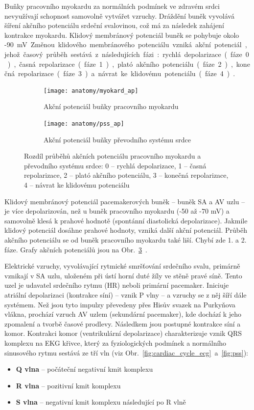 Buňky pracovního myokardu za normálních podmínek ve zdravém srdci nevyužívají
schopnost samovolně vytvářet vzruchy. Dráždění buněk vyvolává šíření akčního
potenciálu srdeční svalovinou, což má za následek zahájení kontrakce myokardu.
Klidový membránový potenciál buněk se pohybuje okolo -90~\si\mV. Změnou klidového
membránového potenciálu vzniká akční potenciál, jehož časový průběh sestává z
následujících fázi: rychlá depolarizace (fáze 0), časná repolarizace (fáze 1),
plató akčního potenciálu (fáze 2), konečná repolarizace (fáze 3) a návrat ke
klidovému potenciálu (fáze 4)~\cite{Petrek2019}.
\begin{figure}[h]
	\centering
	\begin{subfigure}{0.4\textwidth}
		\texttt{[image: anatomy/myokard\_ap]}
		\caption{Akční potenciál buňky pracovního myokardu~\cite{Petrek2019}}
		\label{fig:myokard_ap}
	\end{subfigure}
	\hfil
	\begin{subfigure}{0.5\textwidth}
		\texttt{[image: anatomy/pss\_ap]}
		\caption{Akční potenciál buňky převodního systému
		srdce~\cite{Petrek2019}}
		\label{fig:pss_ap}
	\end{subfigure}
	\caption{Rozdíl průběhů akčních potenciálu pracovního myokardu a převodního
		systému srdce: 0 -- rychlá depolarizace, 1 -- časná repolarizace, 2 --
		plató akčního potenciálu, 3 -- konečná repolarizace, 4 -- návrat ke
		klidovému potenciálu}
	\label{fig:ap}
\end{figure}
Klidový membránový potenciál pacemakerových buněk -- buněk SA a AV uzlu -- je
více depolarizován, než u buněk pracovního myokardu (-50 až -70 mV) a samovolně
klesá k prahové hodnotě (spontánní diastolická depolarizace). Jakmile klidový
potenciál dosáhne prahové hodnoty, vzniká další akční potenciál. Průběh akčního
potenciálu se od buněk pracovního myokardu také liší. Chybí zde 1. a 2. fáze.
Grafy akčních potenciálů jsou na Obr.~\ref{fig:ap}~\cite{Petrek2019}.

Elektrické vzruchy, vyvolávající rytmické smršťování srdečního svalu, primárně
vznikají v SA uzlu, uloženém při ústí horní duté žíly ve stěně pravé síně. Tento
uzel je udavatel srdečního rytmu (HR) neboli primární pacemaker. Iniciuje
atriální depolarizaci (kontrakce síní) -- vznik P vlny -- a vzruchy se z něj
šíří dále systémem. Než jsou tyto impulzy převedeny přes Hisův svazek na
Purkyňova vlákna, prochází vzruch AV uzlem (sekundární pacemaker), kde dochází k
jeho zpomalení a tvorbě časové prodlevy. Následkem jsou postupné kontrakce síní
a komor. Kontrakci komor (ventrikulární depolarizace) charakterizuje vznik QRS
komplexu na EKG křivce, který za fyziologických podmínek a normálního sinusového
rytmu sestává ze tří vln (viz Obr.~\ref{fig:cardiac_cycle_ecg}~a~\ref{fig:pss}):
\begin{itemize}[noitemsep]
	\item \textbf{Q vlna} -- počáteční negativní kmit komplexu
	\item \textbf{R vlna} -- pozitivní kmit komplexu
	\item \textbf{S vlna} -- negativní kmit komplexu následující po R vlně
\end{itemize}

